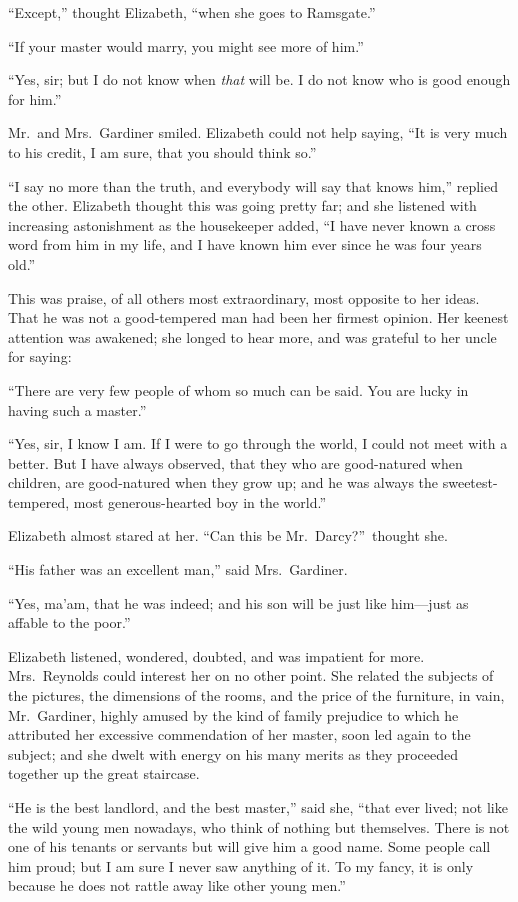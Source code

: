 \documentclass[12pt,english]{book}
\begin{document}
{}``Except,'' thought Elizabeth, {}``when she goes to Ramsgate.''

{}``If your master would marry, you might see more of him.''

{}``Yes, sir; but I do not know when \textit{that} will be. I do
not know who is good enough for him.''

Mr.\ and Mrs.\ Gardiner smiled. Elizabeth could not help saying,
{}``It is very much to his credit, I am sure, that you should think
so.''

{}``I say no more than the truth, and everybody will say that knows
him,'' replied the other. Elizabeth thought this was going pretty
far; and she listened with increasing astonishment as the housekeeper
added, {}``I have never known a cross word from him in my life, and
I have known him ever since he was four years old.''

This was praise, of all others most extraordinary, most opposite to
her ideas. That he was not a good-tempered man had been her firmest
opinion. Her keenest attention was awakened; she longed to hear more,
and was grateful to her uncle for saying:

{}``There are very few people of whom so much can be said. You are
lucky in having such a master.''

{}``Yes, sir, I know I am. If I were to go through the world, I could
not meet with a better. But I have always observed, that they who
are good-natured when children, are good-natured when they grow up;
and he was always the sweetest-tempered, most generous-hearted boy
in the world.''

Elizabeth almost stared at her. {}``Can this be Mr.\ Darcy?''\ thought
she.

{}``His father was an excellent man,'' said Mrs.\ Gardiner.

{}``Yes, ma'am, that he was indeed; and his son will be just like
him\mbox{---}just as affable to the poor.''

Elizabeth listened, wondered, doubted, and was impatient for more.
Mrs.\ Reynolds could interest her on no other point. She related
the subjects of the pictures, the dimensions of the rooms, and the
price of the furniture, in vain, Mr.\ Gardiner, highly amused by
the kind of family prejudice to which he attributed her excessive
commendation of her master, soon led again to the subject; and she
dwelt with energy on his many merits as they proceeded together up
the great staircase.

{}``He is the best landlord, and the best master,'' said she, {}``that
ever lived; not like the wild young men nowadays, who think of nothing
but themselves. There is not one of his tenants or servants but will
give him a good name. Some people call him proud; but I am sure I
never saw anything of it. To my fancy, it is only because he does
not rattle away like other young men.''
\end{document}
